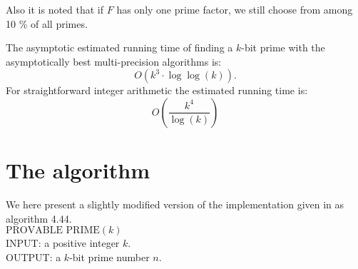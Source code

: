 \documentclass[11pt,a4paper]{article}
\begin{document}
Also it is noted that if $F$ has only one prime factor, we still
choose from among 10 \% of all primes.

The asymptotic estimated running time of finding a $k$-bit prime with the
asymptotically best multi-precision algorithms is:
\[O(k^3\cdot\log\log(k)).\]
For straightforward integer arithmetic the estimated running time is:
\[O(\frac{k^{4}}{\log(k)})\]
\section{The algorithm}
We here present a slightly modified version of the implementation
given in \cite{Menezes:1997:HAC} as algorithm 4.44.\\

\noindent
$\text{PROVABLE PRIME}(k)$\\
INPUT: a positive integer $k$.\\
OUTPUT: a $k$-bit prime number $n$.
\end{document}
